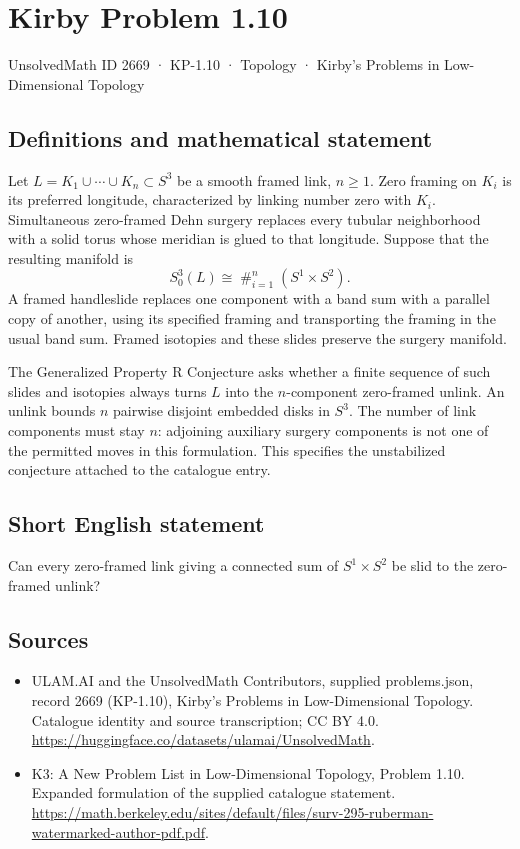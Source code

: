 \documentclass[11pt,a4paper]{article}
\begin{document}
\section*{Kirby Problem 1.10}\label{2669}
{\small UnsolvedMath ID 2669 · KP-1.10 · Topology · Kirby's Problems in Low-Dimensional Topology}
\subsection{Definitions and mathematical statement}
Let $L=K_1\cup\cdots\cup K_n\subset S^3$ be a smooth framed link, $n\geq1$.
Zero framing on $K_i$ is its preferred longitude, characterized by linking number
zero with $K_i$. Simultaneous zero-framed Dehn surgery replaces every tubular
neighborhood with a solid torus whose meridian is glued to that longitude.
Suppose that the resulting manifold is
\[
S^3_0(L)\cong\mathop{\#}_{i=1}^n(S^1\times S^2).
\]
A framed handleslide replaces one component with a band sum with a parallel
copy of another, using its specified framing and transporting the framing in
the usual band sum. Framed isotopies and these slides preserve the surgery
manifold.

The Generalized Property R Conjecture asks whether a finite sequence of such
slides and isotopies always turns $L$ into the $n$-component zero-framed unlink.
An unlink bounds $n$ pairwise disjoint embedded disks in $S^3$.
The number of link components must stay $n$: adjoining auxiliary surgery
components is not one of the permitted moves in this formulation. This specifies
the unstabilized conjecture attached to the catalogue entry.
\subsection{Short English statement}
Can every zero-framed link giving a connected sum of $S^1\times S^2$ be slid to the zero-framed unlink?
\subsection{Sources}
\begin{itemize}
\item[S1] ULAM.AI and the UnsolvedMath Contributors, supplied problems.json, record 2669 (KP-1.10), Kirby's Problems in Low-Dimensional Topology. Catalogue identity and source transcription; CC BY 4.0.
\url{https://huggingface.co/datasets/ulamai/UnsolvedMath}.
\item[S2] K3: A New Problem List in Low-Dimensional Topology, Problem 1.10. Expanded formulation of the supplied catalogue statement.
\url{https://math.berkeley.edu/sites/default/files/surv-295-ruberman-watermarked-author-pdf.pdf}.
\end{itemize}
\end{document}
